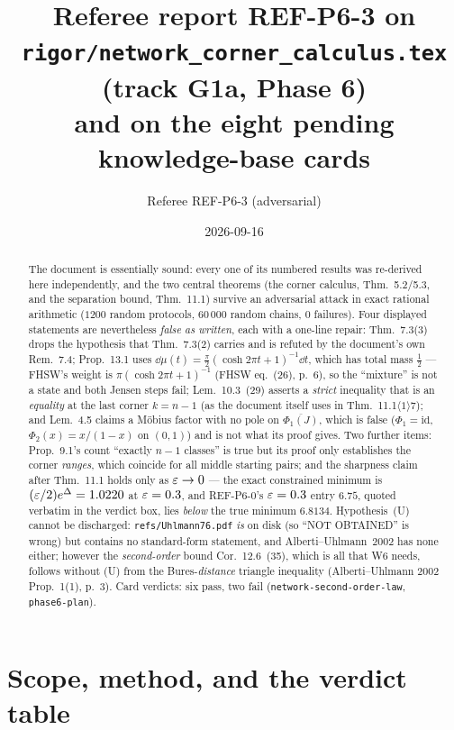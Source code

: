 \documentclass[11pt]{article}
\title{Referee report REF-P6-3 on\\
\texttt{rigor/network\_corner\_calculus.tex} (track G1a, Phase 6)\\
\large and on the eight pending knowledge-base cards}
\author{Referee REF-P6-3 (adversarial)}
\date{2026-09-16}
\newcommand{\id}{\mathrm{id}}
\theoremstyle{definition}\newtheorem{example}[theorem]{Example}
\begin{document}
\maketitle

\begin{abstract}
The document is essentially sound: every one of its numbered results was
re-derived here independently, and the two central theorems (the corner calculus,
Thm.~5.2/5.3, and the separation bound, Thm.~11.1) survive an adversarial attack in exact
rational arithmetic ($1200$ random protocols, $60\,000$ random chains, $0$ failures).
Four displayed statements are nevertheless \emph{false as written}, each with a one-line
repair: Thm.~7.3(3) drops the hypothesis that Thm.~7.3(2) carries and is refuted by the
document's own Rem.~7.4; Prop.~13.1 uses $\dd\mu(t)=\frac\pi2(\cosh2\pi t+1)^{-1}\dd t$,
which has total mass $\frac12$ --- FHSW's weight is $\pi(\cosh2\pi t+1)^{-1}$ (FHSW
eq.~(26), p.~6), so the ``mixture'' is not a state and both Jensen steps fail;
Lem.~10.3~(29) asserts a \emph{strict} inequality that is an \emph{equality} at the last
corner $k=n-1$ (as the document itself uses in Thm.~11.1$\langle1\rangle7$); and
Lem.~4.5 claims a M\"obius factor with no pole on $\overline{\Phi_1(J)}$, which is false
($\Phi_1=\id$, $\Phi_2(x)=x/(1-x)$ on $(0,1)$) and is not what its proof gives.  Two
further items: Prop.~9.1's count ``exactly $n-1$ classes'' is true but its proof only
establishes the corner \emph{ranges}, which coincide for all middle starting pairs; and
the sharpness claim after Thm.~11.1 holds only as $\varepsilon\to0$ --- the exact constrained
minimum is $(\varepsilon/2)e^{\Delta}=1.0220$ at $\varepsilon=0.3$, and REF-P6-0's $\varepsilon=0.3$ entry
$6.75$, quoted verbatim in the verdict box, lies \emph{below} the true minimum $6.8134$.
Hypothesis~(U) cannot be discharged: \texttt{refs/Uhlmann76.pdf} \emph{is} on disk (so
``NOT OBTAINED'' is wrong) but contains no standard-form statement, and
Alberti--Uhlmann~2002 has none either; however the \emph{second-order} bound
Cor.~12.6~(35), which is all that W6 needs, follows without (U) from the Bures-\emph{distance}
triangle inequality (Alberti--Uhlmann 2002 Prop.~1(1), p.~3).  Card verdicts: six pass,
two fail (\texttt{network-second-order-law}, \texttt{phase6-plan}).
\end{abstract}

\tableofcontents

\section{Scope, method, and the verdict table}\label{sec:scope}
\end{document}
